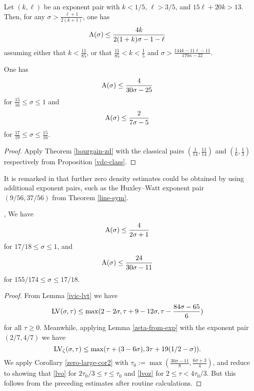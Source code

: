\begin{theorem}\label{bourgain-zd}\cite[Proposition 3]{bourgain_remarks_1995}  Let $(k,\ell)$ be an exponent pair with $k < 1/5$, $\ell > 3/5$, and $15\ell + 20k > 13$.  Then, for any $\sigma > \frac{\ell+1}{2(k+1)}$, one has
    $$ \mathrm{A}(\sigma) \leq \frac{4k}{2(1+k)\sigma - 1 - \ell}$$
    assuming either that $k < \frac{11}{85}$, or that $\frac{11}{85} < k < \frac{1}{5}$ and $\sigma > \frac{144k-11\ell-11}{170\kappa-22}$.
\end{theorem}

\begin{corollary}\label{bourgain-zero-density}\cite[Corollary 4]{bourgain_remarks_1995}  One has
    $$ \mathrm{A}(\sigma) \leq \frac{4}{30\sigma-25}$$
    for $\frac{15}{16} \leq \sigma \leq 1$
    and
    $$ \mathrm{A}(\sigma) \leq \frac{2}{7\sigma-5}$$
    for $\frac{17}{19} \leq \sigma \leq \frac{15}{16}$.
\end{corollary}

\begin{proof} Apply Theorem \ref{bourgain-zd} with the classical pairs $(\frac{1}{14},\frac{11}{14})$ and $(\frac{1}{6}, \frac{1}{3})$ respectively from Proposition \ref{vdc-class}.
\end{proof}

It is remarked in \cite{bourgain_remarks_1995} that further zero density estimates could be obtained by using additional exponent pairs, such as the Huxley--Watt exponent pair $(9/56, 37/56)$ from Theorem \ref{line-sym}.

\begin{lemma}\label{ivic-zero-density}\cite{ivic_exponent_1980}, \cite[Theorem 11.2]{ivic} We have
    $$ \mathrm{A}(\sigma) \leq \frac{4}{2\sigma+1}$$
    for $17/18 \leq \sigma \leq 1$, and
    $$ \mathrm{A}(\sigma) \leq \frac{24}{30\sigma-11}$$
    for $155/174 \leq \sigma \leq 17/18$.
\end{lemma}

\begin{proof}  From Lemma \ref{ivic-lvt} we have
$$  \mathrm{LV}(\sigma,\tau) \leq \max( 2-2\sigma, \tau + 9-12\sigma, \tau - \frac{84\sigma-65}{6})$$
for all $\tau \geq 0$.  Meanwhile, applying Lemma \ref{zeta-from-exp} with the exponent pair $(2/7,4/7)$ we have
$$ \mathrm{LV}_\zeta(\sigma,\tau) \leq \max( \tau + (3-6\sigma), 3\tau + 19(1/2-\sigma)).$$
We apply Corollary \ref{zero-large-cor2} with $\tau_0 := \max( \frac{30\sigma-11}{8}, \frac{6\sigma+3}{4} )$, and reduce to showing that \eqref{lvo} for $2\tau_0/3 \leq \tau \leq \tau_0$ and \eqref{lvoz} for $2 \leq \tau < 4\tau_0/3$.  But this follows from the preceding estimates after routine calculations.
\end{proof}

